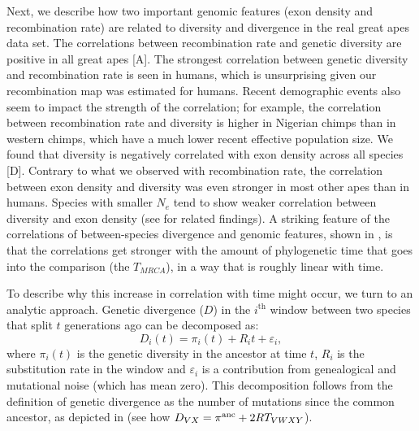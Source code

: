 Next, we describe how two important genomic features (\ie exon density and recombination rate)
are related to diversity and divergence in the real great apes data set.
The correlations between recombination rate and genetic diversity are positive in all great apes [A].
The strongest correlation between genetic diversity and recombination rate is seen in humans, 
which is unsurprising given our recombination map was estimated for humans.
Recent demographic events also seem to impact the strength of the correlation;
for example, the correlation between recombination rate and diversity is higher in Nigerian chimps than in western chimps,
which have a much lower recent effective population size.
We found that diversity is negatively correlated with exon density across all species [D].
Contrary to what we observed with recombination rate, 
the correlation between exon density and diversity was even stronger in most other apes than in humans.
Species with smaller $N_e$ tend to show weaker correlation between diversity and exon density (see \cite{nam_evidence_2017} for related findings).
A striking feature of the correlations of between-species divergence and genomic features, shown in ,
is that the correlations get stronger with the amount of phylogenetic time that goes into the comparison (\ie the $T_{MRCA}$),
in a way that is roughly linear with time. 

To describe why this increase in correlation with time might occur, we turn to an analytic approach.
Genetic divergence ($D$) in the $i^\text{th}$ window between two species that split $t$ generations ago can be decomposed as:
$$D_i(t) = \pi_i(t) + R_i t + \varepsilon_i,$$
where $\pi_i(t)$ is the genetic diversity in the ancestor at time $t$, 
$R_i$ is the substitution rate in the window and $\varepsilon_i$ is a contribution from genealogical and mutational noise (which has mean zero). 
This decomposition follows from the definition of genetic divergence as the number of mutations since the common ancestor,
as depicted in  (see how $D_{VX} = \pi^{\mathrm{anc}} + 2RT_{VWXY}$).

